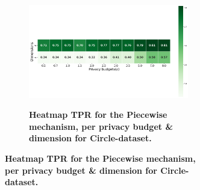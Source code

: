 \begin{figure}[H]
\begin{subfigure}[b]{0.9\textwidth}
        \begin{subfigure}[c]{1\textwidth}
            \caption{\textbf{Heatmap TPR for the Piecewise mechanism, per privacy budget \& dimension for Circle-dataset.}}
            \includegraphics[width=1\textwidth]{Results/kd-laplace/piecewise/circle-dataset/tpr.png}
            \label{fig:privacy_tpr_circle-dataset_adversial_advantage_piecewise}
        \end{subfigure}
    \end{subfigure}
    \hfill %
    \begin{subfigure}[b]{0.075\textwidth}

\end{subfigure}
\end{figure}
